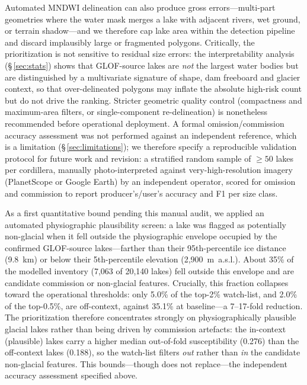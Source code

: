 \documentclass[pdflatex,sn-basic]{sn-jnl}%
\begin{document}
Automated MNDWI delineation can also produce gross errors---multi-part
geometries where the water mask merges a lake with adjacent rivers, wet
ground, or terrain shadow---and we therefore cap lake area within the
detection pipeline and discard implausibly large or fragmented polygons.
Critically, the prioritization is not sensitive to residual size errors:
the interpretability analysis (\S\,\ref{sec:stats}) shows that GLOF-source
lakes are \emph{not} the largest water bodies but are distinguished by a
multivariate signature of shape, dam freeboard and glacier context, so
that over-delineated polygons may inflate the absolute high-risk count but
do not drive the ranking. Stricter geometric quality control (compactness
and maximum-area filters, or single-component re-delineation) is
nonetheless recommended before operational deployment. A formal omission/commission accuracy
assessment was not performed against an independent reference, which is a
limitation (\S\,\ref{sec:limitations}); we therefore specify a
reproducible validation protocol for future work and revision: a
stratified random sample of $\geq\!50$ lakes per cordillera, manually
photo-interpreted against very-high-resolution imagery (PlanetScope or
Google Earth) by an independent operator, scored for omission and
commission to report producer's/user's accuracy and F1 per size class.

As a first quantitative bound pending this manual audit, we applied an
automated physiographic plausibility screen: a lake was flagged as
potentially non-glacial when it fell outside the physiographic envelope
occupied by the confirmed GLOF-source lakes---farther than their
95th-percentile ice distance (9.8~km) or below their 5th-percentile
elevation (2{,}900~m~a.s.l.). About 35\% of the modelled inventory
(7{,}063 of 20{,}140 lakes) fell outside this envelope and are candidate
commission or non-glacial features. Crucially, this fraction collapses
toward the operational thresholds: only 5.0\% of the top-2\% watch-list,
and 2.0\% of the top-0.5\%, are off-context, against 35.1\% at baseline---a
7--17-fold reduction. The prioritization therefore concentrates strongly on
physiographically plausible glacial lakes rather than being driven by
commission artefacts: the in-context (plausible) lakes carry a higher median
out-of-fold susceptibility (0.276) than the off-context lakes (0.188), so the
watch-list filters \emph{out} rather than \emph{in} the candidate
non-glacial features. This bounds---though does not replace---the
independent accuracy assessment specified above.
\end{document}
